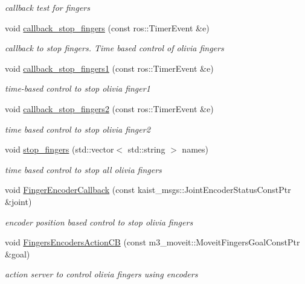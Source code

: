 \begin{DoxyCompactItemize}
\begin{DoxyCompactList}\small\item\em callback test for fingers \end{DoxyCompactList}\item 
void \hyperlink{classM3MoveGroup_a1a515c13453033a4ab89b5599d58f23f}{callback\+\_\+stop\+\_\+fingers} (const ros\+::\+Timer\+Event \&e)
\begin{DoxyCompactList}\small\item\em callback to stop fingers. Time based control of olivia fingers \end{DoxyCompactList}\item 
void \hyperlink{classM3MoveGroup_af7c4ca891be62a8c3fdb7cd0cc0cb2a0}{callback\+\_\+stop\+\_\+fingers1} (const ros\+::\+Timer\+Event \&e)
\begin{DoxyCompactList}\small\item\em time-\/based control to stop olivia finger1 \end{DoxyCompactList}\item 
void \hyperlink{classM3MoveGroup_af6a7a1d4aab641328a9213689f7b9ce1}{callback\+\_\+stop\+\_\+fingers2} (const ros\+::\+Timer\+Event \&e)
\begin{DoxyCompactList}\small\item\em time based control to stop olivia finger2 \end{DoxyCompactList}\item 
void \hyperlink{classM3MoveGroup_aedb5d4a4aaeebd2ef3fa0d54edb0efaa}{stop\+\_\+fingers} (std\+::vector$<$ std\+::string $>$ names)
\begin{DoxyCompactList}\small\item\em time based control to stop all olivia fingers \end{DoxyCompactList}\item 
void \hyperlink{classM3MoveGroup_a7208ba7725391ea9ffd98d3d31ae5f0d}{Finger\+Encoder\+Callback} (const kaist\+\_\+msgs\+::\+Joint\+Encoder\+Status\+Const\+Ptr \&joint)
\begin{DoxyCompactList}\small\item\em encoder position based control to stop olivia fingers \end{DoxyCompactList}\item 
void \hyperlink{classM3MoveGroup_ab202574f8621d26c6369c1b794014251}{Fingers\+Encoders\+Action\+CB} (const m3\+\_\+moveit\+::\+Moveit\+Fingers\+Goal\+Const\+Ptr \&goal)
\begin{DoxyCompactList}\small\item\em action server to control olivia fingers using encoders \end{DoxyCompactList}\item 

\end{DoxyCompactItemize}
